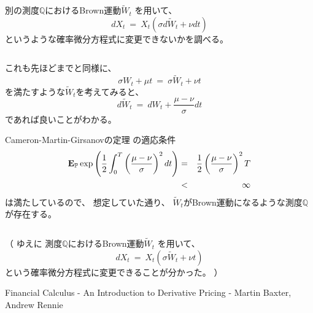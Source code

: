 \documentclass[uplatex,a4j,12pt,dvipdfmx]{jsarticle}
\begin{document}
別の測度$\mathbb{Q}$におけるBrown運動$\tilde{W}_{t}$
を用いて、
$$
	d X_{t}
	\ = \
	X_{t}
	(
	\sigma d \tilde{W}_{t}
	+
	\nu dt
	)
$$
というような確率微分方程式に変更できないかを調べる。

${}$

これも先ほどまでと同様に、
$$
	\sigma W_{t}
	+
	\mu t
	\ = \
	\sigma \tilde{W}_{t}
	+
	\nu t
$$
を満たすような$\tilde{W}_{t}$を考えてみると、
$$
	d \tilde{W}_{t}
	\ = \
	d W_{t}
	+
	\dfrac{ \mu - \nu }{\sigma}
	dt
$$
であれば良いことがわかる。

Cameron-Martin-Girsanovの定理
の適応条件
%
\begin{eqnarray*}
	{\bf E}_{\mathbb{P}} \exp \left( \dfrac{1}{2} \int^{T}_{0}
	\left( \dfrac{ \mu - \nu }{\sigma} \right)^{2} dt \right)
	&=&
	\dfrac{1}{2}
	\left( \dfrac{ \mu - \nu }{\sigma} \right)^{2}
	T
	\\ &<&
	\infty
\end{eqnarray*}
%
は満たしているので、
想定していた通り、
$\tilde{W}_{t}$がBrown運動になるような測度$\mathbb{Q}$が存在する。

${}$

（
ゆえに
測度$\mathbb{Q}$におけるBrown運動$\tilde{W}_{t}$
を用いて、
$$
	d X_{t}
	\ = \
	X_{t}
	(
	\sigma \tilde{W}_{t}
	+
	\nu t
	)
$$
という確率微分方程式に変更できることが分かった。
）
\begin{thebibliography}{9}
	Financial Calculus - An Introduction to Derivative Pricing - Martin Baxter, Andrew Rennie
\end{thebibliography}
\end{document}
